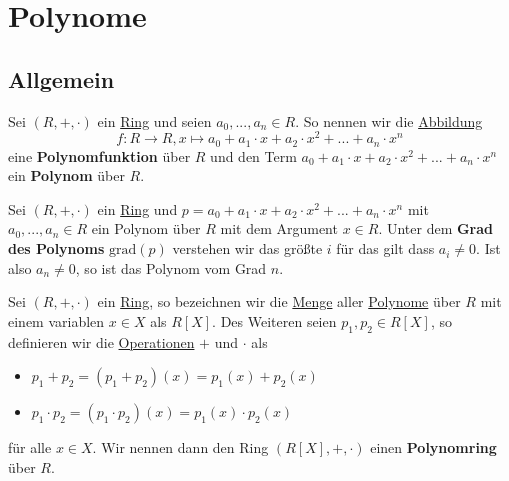 \documentclass[../../main.tex]{subfiles}
\begin{document}
	
	\chapter{Polynome}
	
		\section{Allgemein}

		\begin{definition}
			\label{def:Polynom}
			\label{def:Polynomfunktion}
			Sei $(R,+,\cdot)$ ein \hyperref[def:Ring]{Ring} und seien $a_0,...,a_n \in R$. So nennen wir die \hyperref[def:Abbildung]{Abbildung} $$f:R \rightarrow R, x \mapsto a_0 + a_1 \cdot x + a_2 \cdot x^2 + ... + a_n \cdot x^n$$
			eine \textbf{Polynomfunktion} über $R$ und den Term $a_0 + a_1 \cdot x + a_2 \cdot x^2 + ... + a_n \cdot x^n$ ein \textbf{Polynom} über $R$. 
		\end{definition}
	
		\begin{definition}
			\label{def:GradEinesPolynoms}
			Sei $(R,+,\cdot)$ ein \hyperref[def:Ring]{Ring} und $p = a_0 + a_1 \cdot x + a_2 \cdot x^2 + ... + a_n \cdot x^n$ mit $a_0,...,a_n\in R$ ein Polynom über $R$ mit dem Argument $x \in R$. Unter dem \textbf{Grad des Polynoms} $\textrm{grad}(p)$ verstehen wir das größte $i$ für das gilt dass $a_i \not=0$. Ist also $a_n \not=0$, so ist das Polynom vom Grad $n$.
		\end{definition}
	
		\begin{definition}[Polynomring]
			\label{def:Polynomring}
			Sei $(R,+,\cdot)$ ein \hyperref[def:Ring]{Ring}, so bezeichnen wir die \hyperref[def:Menge]{Menge} aller \hyperref[def:Polynom]{Polynome} über $R$ mit einem variablen $x \in X$ als $R[X]$. Des Weiteren seien $p_1,p_2 \in R[X]$, so definieren wir die \hyperref[def:Operation]{Operationen} $+$ und $\cdot$ als
			\begin{itemize}
				\item $p_1 + p_2 = (p_1 + p_2)(x) = p_1(x) + p_2(x)$
				\item $p_1 \cdot p_2 = (p_1 \cdot p_2)(x) = p_1(x) \cdot p_2(x)$
			\end{itemize}
			für alle $x \in X$. Wir nennen dann den Ring $(R[X],+,\cdot)$ einen \textbf{Polynomring} über $R$.
			
		\end{definition}
	
\end{document}
